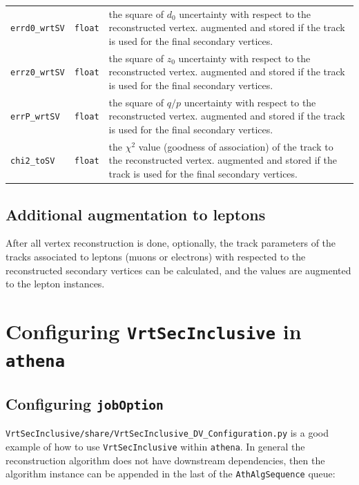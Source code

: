 \documentclass[NOTE, atlasdraft=true, texlive=2018, UKenglish]{\ATLASLATEXPATH atlasdoc}
\begin{document}
\begin{table}[htbp]
\begin{tabular}{llp{11cm}}
{\tt errd0\_wrtSV} & {\tt float} & the square of $d_{0}$ uncertainty with respect to the reconstructed vertex. augmented and stored if the track is used for the final secondary vertices.\\
{\tt errz0\_wrtSV} & {\tt float} & the square of $z_{0}$ uncertainty with respect to the reconstructed vertex. augmented and stored if the track is used for the final secondary vertices.\\
{\tt errP\_wrtSV} & {\tt float} & the square of $q/p$ uncertainty with respect to the reconstructed vertex. augmented and stored if the track is used for the final secondary vertices.\\
{\tt chi2\_toSV} & {\tt float} & the $\chi^{2}$ value (goodness of association) of the track to the reconstructed vertex. augmented and stored if the track is used for the final secondary vertices.\\
\hline
\hline
\end{tabular}
\label{tbl:auxdyn_tracks}
\end{table}%

\subsection{Additional augmentation to leptons}
After all vertex reconstruction is done, optionally, the track parameters of the tracks associated to leptons (muons or electrons) with respected to the reconstructed secondary vertices can be calculated, and the values are augmented to the lepton instances.

\section{Configuring {\tt VrtSecInclusive} in {\tt athena}}
\label{sec:config}

\subsection{Configuring {\tt jobOption}}
{\tt VrtSecInclusive/share/VrtSecInclusive\_DV\_Configuration.py} is a good example of how to use {\tt VrtSecInclusive} within {\tt athena}. In general the reconstruction algorithm does not have downstream dependencies, then the algorithm instance can be appended in the last of the {\tt AthAlgSequence} queue:
\end{document}
